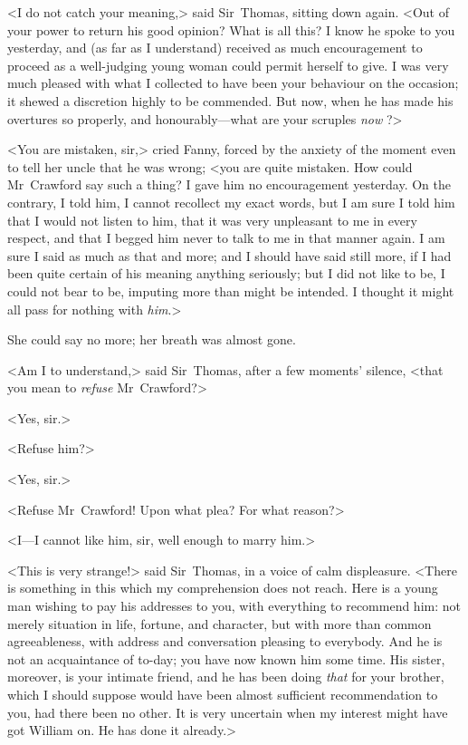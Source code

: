 <I do not catch your meaning,> said Sir~Thomas, sitting down again. <Out of your power to return his good opinion? What is all this? I know he spoke to you yesterday, and (as far as I understand) received as much encouragement to proceed as a well-judging young woman could permit herself to give. I was very much pleased with what I collected to have been your behaviour on the occasion; it shewed a discretion highly to be commended. But now, when he has made his overtures so properly, and honourably—what are your scruples \textit{now} ?>

<You are mistaken, sir,> cried Fanny, forced by the anxiety of the moment even to tell her uncle that he was wrong; <you are quite mistaken. How could Mr~Crawford say such a thing? I gave him no encouragement yesterday. On the contrary, I told him, I cannot recollect my exact words, but I am sure I told him that I would not listen to him, that it was very unpleasant to me in every respect, and that I begged him never to talk to me in that manner again. I am sure I said as much as that and more; and I should have said still more, if I had been quite certain of his meaning anything seriously; but I did not like to be, I could not bear to be, imputing more than might be intended. I thought it might all pass for nothing with \textit{him}.>

She could say no more; her breath was almost gone.

<Am I to understand,> said Sir~Thomas, after a few moments' silence, <that you mean to \textit{refuse}  Mr~Crawford?>

<Yes, sir.>

<Refuse him?>

<Yes, sir.>

<Refuse Mr~Crawford! Upon what plea? For what reason?>

<I—I cannot like him, sir, well enough to marry him.>

<This is very strange!> said Sir~Thomas, in a voice of calm displeasure. <There is something in this which my comprehension does not reach. Here is a young man wishing to pay his addresses to you, with everything to recommend him: not merely situation in life, fortune, and character, but with more than common agreeableness, with address and conversation pleasing to everybody. And he is not an acquaintance of to-day; you have now known him some time. His sister, moreover, is your intimate friend, and he has been doing \textit{that}  for your brother, which I should suppose would have been almost sufficient recommendation to you, had there been no other. It is very uncertain when my interest might have got William on. He has done it already.>

